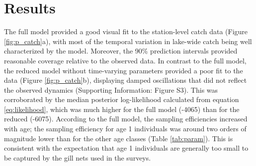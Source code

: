 \documentclass[11pt]{article}
\begin{document}
\section*{Results}

The full model provided a good visual fit to the station-level 
catch data (Figure \ref{fig:p_catch}a),
with most of the temporal variation in lake-wide catch being well characterized by the model.
Moreover, 
the 90\% prediction intervals provided reasonable coverage relative to the observed data.
In contrast to the full model,
the reduced model without time-varying parameters
provided a poor fit to the data (Figure \ref{fig:p_catch}b),
displaying damped oscillations that did not reflect the observed dynamics
(Supporting Information: Figure S3).
This was corroborated by the median posterior log-likelihood calculated
from equation \ref{eq:likelihood},
which was much higher for the full model (-4065) than for the reduced (-6075).
According to the full model, 
the sampling efficiencies increased with age;
the sampling efficiency for age 1 individuals was around two orders of magnitude lower
than for the other age classes (Table \ref{tab:param}). 
This is consistent with the expectation that age 1 individuals 
are generally too small to be captured by the gill nets used in the surveys.
\end{document}
